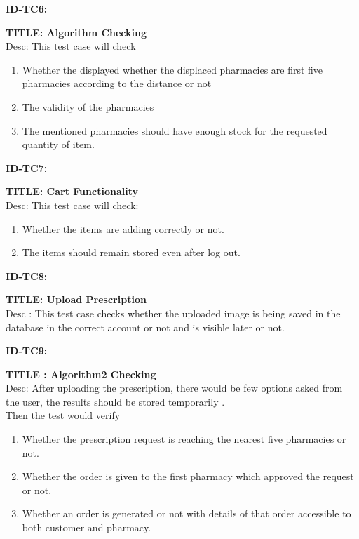 \documentclass{article}
\begin{document}
\item \textbf{ID-TC6:}
\item \textbf{TITLE: Algorithm Checking}\\
Desc: This test case will check
\begin{enumerate} 
\item Whether  the displayed whether the displaced pharmacies are first five pharmacies according to the distance or not 
\item The validity of the pharmacies
\item The mentioned pharmacies should have enough stock for the requested quantity of item.
\end{enumerate}

\item \textbf{ID-TC7:}
\item \textbf{TITLE: Cart Functionality}\\
Desc: This test case will check:
\begin{enumerate}
\item Whether the items are adding correctly or not.
\item The items should remain stored even after log out.
\end{enumerate}

\item \textbf{ID-TC8:}
\item \textbf{TITLE: Upload Prescription}\\
Desc : This test case checks whether the uploaded image is being saved in the database in the correct account or not and is visible later or not.\\

\item \textbf{ID-TC9:}
\item \textbf{TITLE : Algorithm2 Checking}\\
Desc: After uploading the prescription, there would be few options asked from the user, the results should be stored temporarily .\\
Then the test would verify
\begin{enumerate}	
\item Whether the prescription request is reaching the nearest five pharmacies or not.
\item	Whether the order is given to the first pharmacy which approved the request or not.
\item	Whether an order is generated or not with details of that order accessible to both customer and pharmacy.
\end{enumerate}
\end{document}

